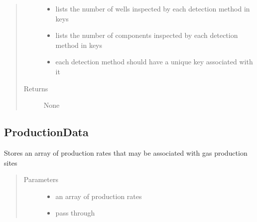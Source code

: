 \documentclass[letterpaper,10pt,english]{sphinxmanual}
\begin{document}
\begin{fulllineitems}
\begin{fulllineitems}
\begin{quote}
\begin{description}
\begin{itemize}
\item {} 
 \textendash{} lists the number of wells inspected by each detection method in keys

\item {} 
 \textendash{} lists the number of components inspected by each detection method in keys

\item {} 
 \textendash{} each detection method should have a unique key associated with it

\end{itemize}

\item[{Returns}] \leavevmode
None

\end{description}\end{quote}

\end{fulllineitems}


\end{fulllineitems}



\subsection{ProductionData}
\label{\detokenize{index:productiondata}}

\begin{fulllineitems}
\label{\detokenize{index:feast.input_data_classes.ProductionData}}
Stores an array of production rates that may be associated with gas production sites
\begin{quote}\begin{description}
\item[{Parameters}] \leavevmode\begin{itemize}
\item {} 
 \textendash{} an array of production rates

\item {} 
 \textendash{} pass through

\end{itemize}

\end{description}\end{quote}

\end{fulllineitems}
\end{document}
